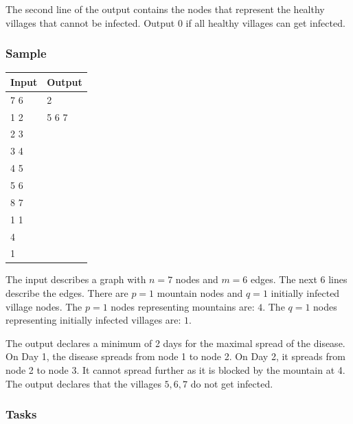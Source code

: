 \documentclass[a4paper]{exam}
\newcommand\heading[1]{\subsubsection*{#1}}
\begin{document}
\begin{questions}
The second line of the output contains the nodes that represent the healthy villages that cannot be infected. Output 0 if all healthy villages can get infected.

\heading{Sample}
\begin{minipage}{.2\textwidth}
\begin{tabular}{|l|l|}
  \hline
  Input & Output\\\hline
7 6 & 2 \\
1 2 & 5 6 7\\
2 3 & \\
3 4 & \\
4 5 & \\
5 6 & \\
8 7 & \\
1 1 & \\
4 & \\
1 & \\\hline
\end{tabular}
\end{minipage}
\begin{minipage}{.75\textwidth}
The input describes a graph with $n=7$ nodes and $m=6$ edges. The next 6 lines describe the edges. There are $p=1$ mountain nodes and $q=1$ initially infected village nodes. The $p=1$ nodes representing mountains are: $4$. The $q=1$ nodes representing initially infected villages are: $1$.

The output declares a minimum of 2 days for the maximal spread of the disease. On Day 1, the disease spreads from node 1 to node 2. On Day 2, it spreads from node 2 to node 3. It cannot spread further as it is blocked by the mountain at 4. The output declares that the villages $5, 6, 7$ do not get infected.
\end{minipage}

\heading{Tasks}

\end{questions}
\end{document}
